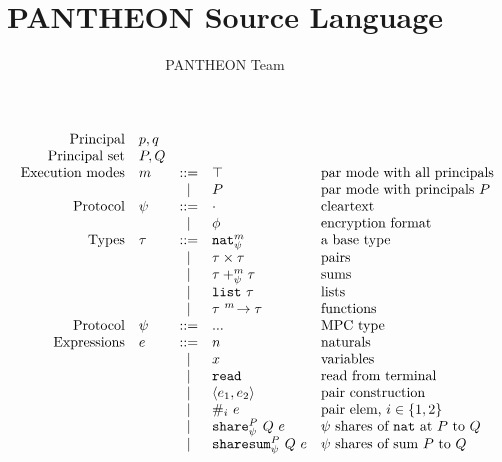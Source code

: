 \documentclass[10pt]{article}
\title{PANTHEON Source Language}
\author{PANTHEON Team}
\newcommand{\kw}[1]{\ensuremath{\mathtt{#1}}}
\newcommand{\tnat}{\ensuremath{\mathtt{nat}}}
\newcommand{\tlist}[1]{\ensuremath{\mathtt{list}~{#1}}}
\newcommand{\tfun}[3]{\ensuremath{{#1} ~^{#3}\!\rightarrow {#2}}}
\newcommand{\tprod}[2]{\ensuremath{{#1} \times {#2}}}
\newcommand{\tsum}[4]{\ensuremath{{#1} +^{#3}_{#4} {#2}}}
\newcommand{\isec}{\ensuremath{\mathtt{pmap}}}
\newcommand{\eshare}[4]{\ensuremath{\kw{share}^{#2}_{#1}~{#3}~{#4}}}
\newcommand{\esharesum}[4]{\ensuremath{\kw{sharesum}^{#2}_{#1}~{#3}~{#4}}}
\newcommand{\econcat}[2]{\ensuremath{{#1} +\!\!+~ {#2}}}
\newcommand{\eaccval}[2]{\ensuremath{{#1}.{#2}}}
\newcommand{\eread}{\ensuremath{\kw{read}}}
\newcommand{\epair}[2]{\ensuremath{\langle {#1}, {#2} \rangle}}
\newcommand{\eproj}[2]{\ensuremath{\kw{\#}}_{#1}~{#2}}
\begin{document}
\maketitle

\begin{figure}[h]
  \centering
  \[\begin{array}{rlcll}
      \text{Principal} & p, q \\
      \text{Principal set} & P, Q \\
    \text{Execution modes} & m  & ::=  & \top & \text{par mode with all principals}\\
                       && \mid & P & \text{par mode with principals $P$} \\
      \text{Protocol} & \psi & ::= & \cdot & \text{cleartext} \\
                       && \mid & \phi & \text{encryption format} \\
      \text{Types} & \tau & ::=  & \tnat^m_\psi & \text{a base type} \\
                       && \mid & \tprod{\tau}{\tau} & \text{pairs} \\
                       && \mid & \tsum{\tau}{\tau}{m}{\psi} & \text{sums} \\
                       && \mid & \tlist{\tau} & \text{lists} \\
                       && \mid & \tfun{\tau}{\tau}{m} & \text{functions} \\
      \text{Protocol} & \psi & ::= & ... & \text{MPC type} \\
      \text{Expressions} & e & ::= & n & \text{naturals} \\
                       && \mid & x & \text{variables} \\
                       && \mid & \eread & \text{read from terminal}\\
                       && \mid & \epair{e_1}{e_2} & \text{pair construction}\\
                       && \mid & \eproj{i}{e} & \text{pair elem, }i \in \{1,2\}\\
                       && \mid & \eshare{\psi}{P}{Q}{e} & \text{$\psi$ shares of {\tnat} at $P$ to $Q$} \\
                       && \mid & \esharesum{\psi}{P}{Q}{e} & \text{$\psi$ shares of sum $P$ to $Q$} \\

\end{array}\]
\end{figure}
\end{document}
